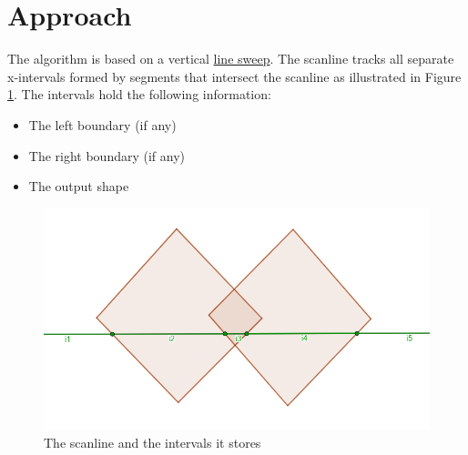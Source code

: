 \documentclass[12pt]{article}
\begin{document}
\newpage
\section*{Approach}

The algorithm is based on a vertical \href{https://en.wikipedia.org/wiki/Sweep_line_algorithm}{line sweep}. The scanline tracks all separate x-intervals formed by segments that intersect the scanline as illustrated in Figure \ref{fig:intersectionScanline}. The intervals hold the following information:
\begin{itemize}
    \item The left boundary (if any)
    \item The right boundary (if any)
    \item The output shape
\end{itemize}
\begin{figure}[!htb]
  \includegraphics[width=\linewidth]{Images/intersection_scanline.png}
  \caption{The scanline and the intervals it stores}
  \label{fig:intersectionScanline}
\end{figure}
\end{document}
